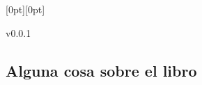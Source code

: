 \documentclass[12pt]{book}
\newlength{\PictHOffset}
\newlength{\PictVOffset}
\begin{document}
\begin{titlepage}
   \noindent\hspace*{-\PictHOffset}%
   \raisebox{\PictVOffset}[0pt][0pt]{
   }
   \vfill
     \begin{flushright}
     	v0.0.1
     	\end{flushright}
\end{titlepage}

\thispagestyle{empty}
\subsection*{\center \normalsize Alguna cosa sobre el libro}
 
\tableofcontents 
\mainmatter












 
\end{document}
